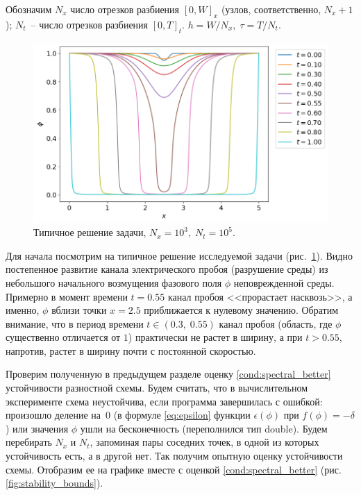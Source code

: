 Обозначим $N_x$ число отрезков разбиения $[0, W]_x$ (узлов, соответственно, $N_x + 1$); $N_t$~-- число отрезков разбиения $[0, T]_t$. $h = W / N_x, \; \tau = T / N_t$.

\begin{figure}[!t]
	\centering
	\includegraphics[width=\textwidth]{figures/typical_solution.png}
	\vspace{-0.8cm}
	\caption{Типичное решение задачи, $N_x = 10^3, \; N_t = 10^5$.}
	\label{fig:typical_solution}
\end{figure}

Для начала посмотрим на типичное решение исследуемой задачи (рис.~\ref{fig:typical_solution}). Видно постепенное развитие канала электрического пробоя (разрушение среды) из небольшого начального возмущения фазового поля $\phi$ неповрежденной среды. Примерно в момент времени $t = 0.55$ канал пробоя <<прорастает насквозь>>, а именно, $\phi$ вблизи точки $x = 2.5$ приближается к нулевому значению. Обратим внимание, что в период времени $t \in (0.3, \; 0.55)$ канал пробоя (область, где $\phi$ существенно отличается от $1$) практически не растет в ширину, а при $t > 0.55$, напротив, растет в ширину почти с постоянной скоростью.

Проверим полученную в предыдущем разделе оценку \eqref{cond:spectral_better} устойчивости разностной схемы. Будем считать, что в вычислительном эксперименте схема неустойчива, если программа завершилась с ошибкой: произошло деление на~$0$ (в формуле \eqref{eq:epsilon} функции $\epsilon(\phi)$ при $f(\phi) = -\delta$) или значения $\phi$ ушли на бесконечность (переполнился тип double). Будем перебирать $N_x$ и $N_t$, запоминая пары соседних точек, в одной из которых устойчивость есть, а в другой нет. Так получим опытную оценку устойчивости схемы. Отобразим ее на графике вместе с оценкой \eqref{cond:spectral_better} (рис. \ref{fig:stability_bounds}).


